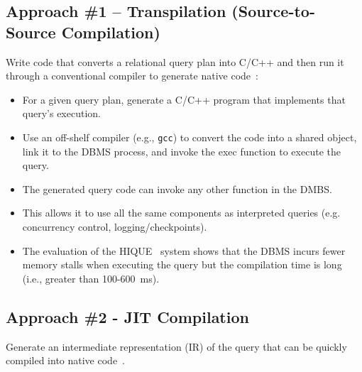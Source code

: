 \documentclass[11pt]{article}
\begin{document}
\subsection*{Approach \#1 -- Transpilation (Source-to-Source Compilation)}
Write code that converts a relational query plan into 
C/C++ and then run it through a conventional compiler to generate native 
code~\cite{krikellas10}:
\begin{itemize}
    \item
    For a given query plan, generate a C/C++ program that implements that query's execution.
    
    \item
    Use an off-shelf compiler (e.g., \texttt{gcc}) to convert the code into a shared object, 
    link it to the DBMS process, and invoke the exec function to execute the query.
    
    \item
    The generated query code can invoke any other function in the DMBS.
    
    \item
    This allows it to use all the same components as interpreted queries (e.g. 
    concurrency control, logging/checkpoints).
    
    \item
    The evaluation of the HIQUE~\cite{krikellas10} system shows that the DBMS incurs fewer 
    memory stalls when executing the query but the compilation time is long (i.e., 
    greater than 100-600~ms).
\end{itemize}
    
\subsection*{Approach \#2 - JIT Compilation}
Generate an intermediate representation (IR) of the query that can be quickly compiled into 
native code~\cite{neumann11}.
\end{document}
